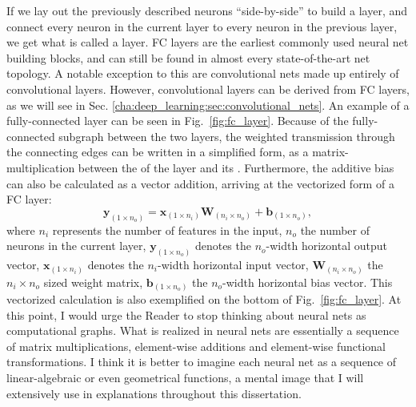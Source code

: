 			If we lay out the previously described neurons ``side-by-side'' to build a layer, and connect every neuron in the current layer to every neuron in the previous layer, we get what is called a  layer.
			\ac{FC} layers are the earliest commonly used neural net building blocks, and can still be found in almost every state-of-the-art net topology.
			A notable exception to this are convolutional nets made up entirely of convolutional layers.
			However, convolutional layers can be derived from \ac{FC} layers, as we will see in Sec. \ref{cha:deep_learning:sec:convolutional_nets}.
			An example of a fully-connected layer can be seen in Fig.~\ref{fig:fc_layer}.
			Because of the fully-connected subgraph between the two layers, the weighted transmission through the connecting edges can be written in a simplified form, as a matrix-multiplication between the  of the layer and its .
			Furthermore, the additive bias can also be calculated as a vector addition, arriving at the vectorized form of a \ac{FC} layer:
			\begin{equation}
				\label{eq:fc_layer}
				\mathbf{y}_{(1 \times n_o)} = \mathbf{x}_{(1 \times n_i)}\mathbf{W}_{(n_i \times n_o)} + \mathbf{b}_{(1 \times n_o)},
			\end{equation}
			\noindent where $n_i$ represents the number of features in the input, $n_o$ the number of neurons in the current layer, $\mathbf{y}_{(1 \times n_o)}$ denotes the $n_o$-width horizontal output vector, $\mathbf{x}_{(1 \times n_i)}$ denotes the $n_i$-width horizontal input vector, $\mathbf{W}_{(n_i \times n_o)}$ the $n_i \times n_o$ sized weight matrix, $\mathbf{b}_{(1 \times n_o)}$ the $n_o$-width horizontal bias vector.
			This vectorized calculation is also exemplified on the bottom of Fig.~\ref{fig:fc_layer}.
			At this point, I would urge the Reader to stop thinking about neural nets as computational graphs.
			What is realized in neural nets are essentially a sequence of matrix multiplications, element-wise additions and element-wise functional transformations.
			I think it is better to imagine each neural net as a sequence of linear-algebraic or even geometrical functions, a mental image that I will extensively use in explanations throughout this dissertation.
		
